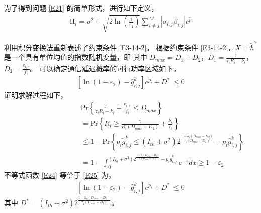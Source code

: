 为了得到问题 \eqref{E21} 的简单形式，进行如下定义，
\begin{eqnarray}\label{E22}
\ \mathrm{\Pi}_i=\sigma^2+\sqrt{2\ln\left(\frac{1}{\varepsilon_1}\right)}\sum_{i\neq j}^{M}{\left|\sigma_{i,j}\beta_{i,j}\right|e^{{\widetilde{p}}_i}}
\end{eqnarray}

利用积分变换法重新表述了约束条件 \eqref{E3-14-2}。 根据约束条件 \eqref{E3-14-2}，$X={\widetilde{h}}^2$ 是一个具有单位均值的指数随机变量，即 其中 $D_{max}=D_1+D_2 $，$D_1=\frac{1}{\tau_iR_i-k_i} $，$D_2=\frac{c_{i,e}}{f_i} $。 可以确定通信延迟概率的可行功率区域如下，
\begin{eqnarray}\label{E23}
\left.\left[\ln\left(1-\varepsilon_2\right)-{\hat{g}}_{i,j}^k\right.\right]e^{{\widetilde{p}}_i}+D^\ast\ \le0
\end{eqnarray}
证明求解过程如下，
\begin{equation}\label{E24}
\begin{array}{ll}
\qquad\qquad\qquad\qquad\quad\textrm{Pr}\left\{\frac{1}{\tau_iR_i-k_i}+\frac{c_{i,e}}{f_i}\le D_{max}\right\}\\
\qquad\qquad\qquad\qquad\quad=\textrm{Pr}\left\{R_i\geq\frac{1}{R_i\left(D_{max}-D_2\right)}+\frac{k_i}{\tau_i}\right\}\\
\qquad\qquad\qquad\qquad\quad\!\le1\!-\!\textrm{Pr}\left\{p_i{\widetilde{g}}_{i,j}^k\le\left(I_{th}+\sigma^2\right)2^\frac{1+k_i\left(D_{max}-D_2\right)}{\tau_i\left(D_{max}-D_2\right)}-p_i{\hat{g}}_{i,j}^k\right\}\\
\qquad\qquad\qquad\qquad\quad=\!1\!-\!\int_{0}^{\left(I_{th}+\sigma^2\right)2^\frac{1+k_i\left(D_{max}-D_2\right)}{\tau_i\left(D_{max}-D_2\right)}-p_i{\hat{g}}_{i,j}^k}{e^{-x}dx}\!\geq\!1-\varepsilon_2
\end{array}
\end{equation}
不等式函数 \eqref{E24} 等价于 \eqref{E25} 为，
\begin{eqnarray}\label{E25}
\left.\left[\ln\left(1-\varepsilon_2\right)-{\hat{g}}_{i,j}^k\right.\right]e^{{\widetilde{p}}_i}+D^\ast\ \le0
\end{eqnarray}
其中 $D^\ast=\left(I_{th}+\sigma^2\right)2^\frac{1+k_i\left(D_{max}-D_2\right)}{\tau_i\left(D_{max}-D_2\right)}$。

